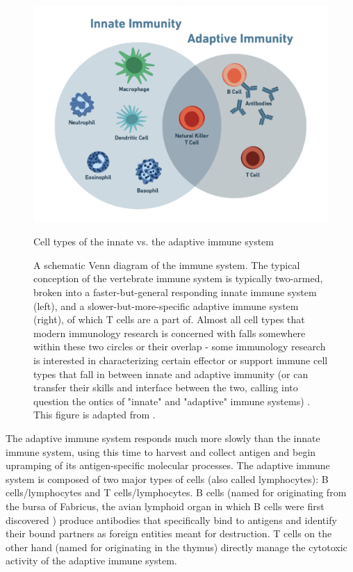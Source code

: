 \begin{figure}[htbp]
	\centering
	\includegraphics[width=\textwidth]{../figures/chapter1/innateadaptiveimmunesystem.png}
	\caption{Cell types of the innate vs. the adaptive immune system}
	\caption*{A schematic Venn diagram of the immune system. The typical conception of the vertebrate immune system is typically two-armed, broken into a faster-but-general responding innate immune system (left), and a slower-but-more-specific adaptive immune system (right), of which T cells are a part of.  Almost all cell types that modern immunology research is concerned with falls somewhere within these two circles or their overlap - some immunology research is interested in characterizing certain effector or support immune cell types that fall in between innate and adaptive immunity (or can transfer their skills and interface between the two, calling into question the ontics of "innate" and "adaptive" immune systems) \cite{Heidegger1962}. This figure is adapted from \cite{Alam2007}.}
	\label{fig:innateadaptiveimmunesystem}
\end{figure}

The adaptive immune system responds much more slowly than the innate immune system, using this time to harvest and collect antigen and begin upramping of its antigen-specific molecular processes. The adaptive immune system is composed of two major types of cells (also called lymphocytes): B cells/lymphocytes and T cells/lymphocytes. B cells (named for originating from the bursa of Fabricus, the avian lymphoid organ in which B cells were first discovered \cite{Cooper2015}) produce antibodies that specifically bind to antigens and identify their bound partners as foreign entities meant for destruction. T cells on the other hand (named for originating in the thymus) directly manage the cytotoxic activity of the adaptive immune system. 

